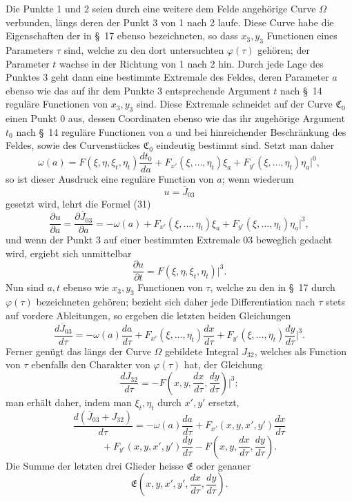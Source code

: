 \documentclass[11pt,a4paper,leqno]{article}
\begin{document}
 Die Punkte 1 und 2 seien durch eine weitere dem Felde angehörige Curve $\Omega$ verbunden, längs deren der Punkt 3 von 1 nach 2 laufe. Diese Curve habe die Eigenschaften der in \S~17 ebenso bezeichneten, so dass $x_3,y_3$ Functionen eines Parameters $\tau$ sind, welche zu den dort untersuchten $\varphi(\tau)$ gehören; der Parameter $t$ wachse in der Richtung von 1 nach 2 hin. Durch jede Lage des Punktes 3 geht dann eine bestimmte Extremale des Feldes, deren Parameter $a$ ebenso wie das auf ihr dem Punkte 3 entsprechende Argument $t$ nach \S~14 reguläre Functionen von $x_3,y_3$ sind. Diese Extremale schneidet auf der Curve $\mathfrak{C}_0$ einen Punkt 0 aus, dessen Coordinaten ebenso wie das ihr zugehörige Argument $t_0$ nach \S~14 reguläre Functionen von $a$ und bei hinreichender Beschränkung des Feldes, sowie des Curvenstückes $\mathfrak{C}_0$ eindeutig bestimmt sind. Setzt man daher
\[
\omega(a)=
F(\xi,\eta,\xi_t,\eta_t)\frac{dt_0}{da}
+F_{x'}(\xi,\ldots,\eta_t)\xi_a
+F_{y'}(\xi,\ldots,\eta_t)\eta_a\bigg|^0,
\]
so ist dieser Ausdruck eine reguläre Function von $a$; wenn wiederum
\[
u=\overline{J}_{03}
\]
gesetzt wird, lehrt die Formel (31)
\[
\frac{\partial u}{\partial a}
=
\frac{\partial\overline{J}_{03}}{\partial a}
=
-\omega(a)+F_{x'}(\xi,\ldots,\eta_t)\xi_a
+F_{y'}(\xi,\ldots,\eta_t)\eta_a\bigg|^3,
\]
und wenn der Punkt 3 auf einer bestimmten Extremale 03 beweglich gedacht wird, ergiebt sich unmittelbar
\[
\frac{\partial u}{\partial t}=F(\xi,\eta,\xi_t,\eta_t)\bigg|^3.
\]
Nun sind $a,t$ ebenso wie $x_3,y_3$ Functionen von $\tau$, welche zu den in \S~17 durch $\varphi(\tau)$ bezeichneten gehören; bezieht sich daher jede Differentiation nach $\tau$ stets auf vordere Ableitungen, so ergeben die letzten beiden Gleichungen
\[
\frac{d\overline{J}_{03}}{d\tau}
=
-\omega(a)\frac{da}{d\tau}
+F_{x'}(\xi,\ldots,\eta_t)\frac{dx}{d\tau}
+F_{y'}(\xi,\ldots,\eta_t)\frac{dy}{d\tau}\bigg|^3.
\]
Ferner genügt das längs der Curve $\Omega$ gebildete Integral $J_{32}$, welches als Function von $\tau$ ebenfalls den Charakter von $\varphi(\tau)$ hat, der Gleichung
\[
\frac{dJ_{32}}{d\tau}
=
-F\left(x,y,\frac{dx}{d\tau},\frac{dy}{d\tau}\right)\bigg|^3;
\]
man erhält daher, indem man $\xi_t,\eta_t$ durch $x',y'$ ersetzt,
\[
\frac{d(\overline{J}_{03}+J_{32})}{d\tau}
=
-\omega(a)\frac{da}{d\tau}
+F_{x'}(x,y,x',y')\frac{dx}{d\tau}
\]
\[
\qquad
+F_{y'}(x,y,x',y')\frac{dy}{d\tau}
-F\left(x,y,\frac{dx}{d\tau},\frac{dy}{d\tau}\right).
\]
Die Summe der letzten drei Glieder heisse $\mathfrak{E}$ oder genauer
\[
\mathfrak{E}\left(x,y,x',y',\frac{dx}{d\tau},\frac{dy}{d\tau}\right).
\]
\end{document}

